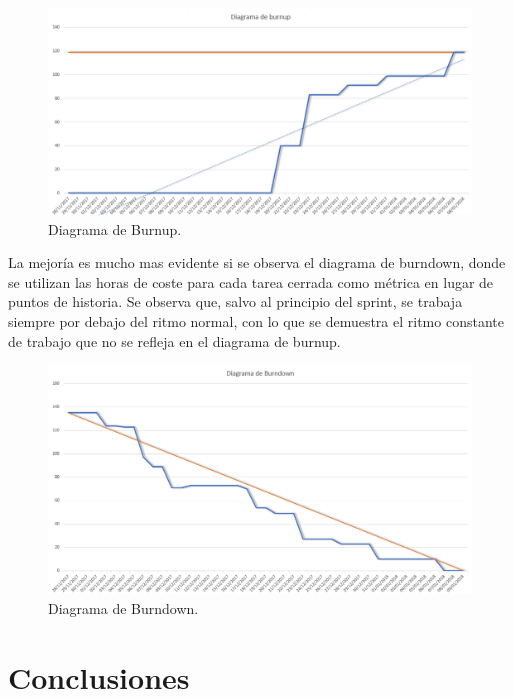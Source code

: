 \documentclass[11pt,a4paper]{report}
\begin{document}
\begin{figure}[H]
 
	\centering
 
	\includegraphics[width=1\textwidth]{graficos/burnup.png}
 
	\caption{Diagrama de Burnup.}
 
	\label{fig: burnup2}
 
\end{figure}

La mejoría es mucho mas evidente si se observa el diagrama de burndown, donde se utilizan las horas de coste para cada tarea cerrada como métrica en lugar de puntos de historia. Se observa que, salvo al principio del sprint, se trabaja siempre por debajo del ritmo normal, con lo que se demuestra el ritmo constante de trabajo que no se refleja en el diagrama de burnup.

\begin{figure}[H]
	\centering
	\includegraphics[width=1\textwidth]{graficos/burndown.png}
	\caption{Diagrama de Burndown.}
	\label{fig: burndown2}
\end{figure}
\chapter{Conclusiones}
\end{document}
